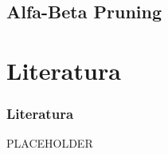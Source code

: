 \documentclass[polish,envcountsect,10pt]{beamer}
\begin{document}
        \subsection{Alfa-Beta Pruning}
            \begin{frame}
            \end{frame}
    \section{Literatura}
        \begin{frame}
            \frametitle{Literatura}
            \begin{thebibliography}{9}
                PLACEHOLDER
            \end{thebibliography}
        \end{frame}
\end{document}

